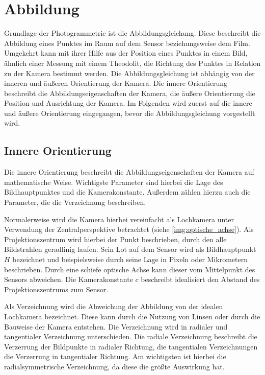 \documentclass[./00PhotoBox.tex]{subfiles}
\begin{document}
\section{Abbildung}
\label{s:abbildung}
Grundlage der Photogrammetrie ist die Abbildungsgleichung. Diese beschreibt die Abbildung eines Punktes im Raum auf dem Sensor beziehungsweise dem Film. Umgekehrt kann mit ihrer Hilfe aus der Position eines Punktes in einem Bild, ähnlich einer Messung mit einem Theodolit, die Richtung des Punktes in Relation zu der Kamera bestimmt werden. Die Abbildungsgleichung ist abhängig von der inneren und äußeren Orientierung der Kamera. Die innere Orientierung beschreibt die Abbildungseigenschaften der Kamera, die äußere Orientierung die Position und Ausrichtung der Kamera. Im Folgenden wird zuerst auf die innere und äußere Orientierung eingegangen, bevor die Abbildungsgleichung vorgestellt wird.

\subsection{Innere Orientierung}
\label{s:innereorientierung}
Die innere Orientierung beschreibt die Abbildungseigenschaften der Kamera auf mathematische Weise. Wichtigste Parameter sind hierbei die Lage des Bildhauptpunktes und die Kamerakonstante. Außerdem zählen hierzu auch die Parameter, die die Verzeichnung beschreiben. \citep[S. 179f]{luhmann}

Normalerweise wird die Kamera hierbei vereinfacht als Lochkamera unter Verwendung der Zentralperspektive betrachtet (siehe \autoref{img:optische_achse}). Als Projektionszentrum wird hierbei der Punkt beschrieben, durch den alle Bildstrahlen geradlinig laufen. Sein Lot auf dem Sensor wird als Bildhauptpunkt $H$ bezeichnet und beispielsweise durch seine Lage in Pixeln oder Mikrometern beschrieben. Durch eine schiefe optische Achse kann dieser vom Mittelpunkt des Sensors abweichen. Die Kamerakonstante $c$ beschreibt idealisiert den Abstand des Projektionszentrums zum Sensor. \citep[S. 177]{luhmann}

Als Verzeichnung wird die Abweichung der Abbildung von der idealen Lochkamera bezeichnet. Diese kann durch die Nutzung von Linsen oder durch die Bauweise der Kamera entstehen. Die Verzeichnung wird in radialer und tangentialer Verzeichnung unterschieden. Die radiale Verzeichnung beschreibt die Verzerrung der Bildpunkte in radialer Richtung, die tangentialen Verzeichnungen die Verzerrung in tangentialer Richtung. Am wichtigsten ist hierbei die radialsymmetrische Verzeichnung, da diese die größte Auswirkung hat. \citep[S. 178]{luhmann}
\end{document}
